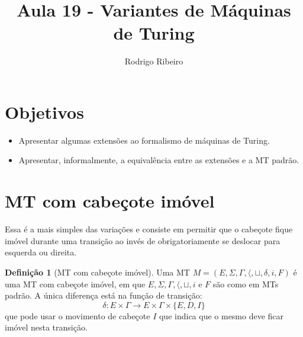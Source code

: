 \documentclass[a4paper]{article}
\theoremstyle{definition}
\newtheorem{Definition}{Definição}
\begin{document}
\title{Aula 19 - Variantes de Máquinas de Turing}
  \author{Rodrigo Ribeiro}

  \maketitle

  

  \pagestyle{fancy}


  \section*{Objetivos}

  \begin{itemize}
     \item Apresentar algumas extensões ao formalismo de máquinas de Turing.
     \item Apresentar, informalmente, a equivalência entre as extensões e
           a MT padrão.
  \end{itemize}

  \section{MT com cabeçote imóvel}

  Essa é a mais simples das variações e consiste em permitir que o cabeçote
  fique imóvel durante uma transição ao invés de obrigatoriamente se deslocar
  para esquerda ou direita.

  \begin{Definition}[MT com cabeçote imóvel]
    Uma MT $M = (E,\Sigma, \Gamma, \langle, \sqcup, \delta, i, F)$ é uma MT
    com cabeçote imóvel, em que $E,\Sigma, \Gamma, \langle, \sqcup, i $ e $F$
    são como em MTs padrão. A única diferença está na função de transição:
    \[
      \delta : E \times \Gamma \to E \times \Gamma \times \{E,D,I\}
    \]
    que pode usar o movimento de cabeçote $I$ que indica que o mesmo deve ficar
    imóvel nesta transição.
  \end{Definition}
\end{document}
